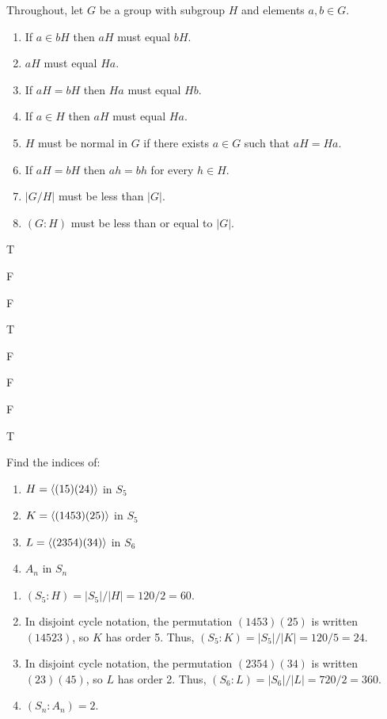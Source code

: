 \begin{exercise}
\tf Throughout, let $G$ be a group with subgroup $H$ and elements $a,b\in G$.

\begin{enumerate}
\item If $a\in bH$ then $aH$ must equal $bH$.
\item $aH$ must equal $Ha$.
\item If $aH=bH$ then $Ha$ must equal $Hb$.
\item If $a\in H$ then $aH$ must equal $Ha$.
\item $H$ must be normal in $G$ if there exists $a\in G$ such that $aH=Ha$.
\item If $aH=bH$ then $ah=bh$ for every $h\in H$.
\item $|G/H|$ must be less than $|G|$.
\item $(G:H)$ must be less than or equal to $|G|$.
\end{enumerate}
\end{exercise}

\begin{solution}[print=false]
\begin{inparaenum}[(a)]
\item T \hfill \item F \hfill \item F \hfill \item T \hfill \item F \hfill \item F \hfill \item F \hfill \item T
\end{inparaenum}
\end{solution}

\begin{exercise}
Find the indices of:

\begin{enumerate}\item $H=\langle(15)(24)\rangle$ in $S_5$
\item $K=\langle(1453)(25)\rangle$ in $S_5$
\item $L=\langle(2354)(34)\rangle$ in $S_6$
\item $A_n$ in $S_n$
\end{enumerate}
\end{exercise}


\begin{solution}[print=false]
 \begin{enumerate}\item $(S_5:H)=|S_5|/|H|=120/2=60.$
\item In disjoint cycle notation, the permutation $(1453)(25)$ is written $(14523)$, so $K$ has order 5. Thus, $(S_5:K)=|S_5|/|K|=120/5=24.$
\item In disjoint cycle notation, the permutation $(2354)(34)$ is written $(23)(45)$, so $L$ has order 2. Thus, $(S_6:L)=|S_6|/|L|=720/2=360.$
\item $(S_n:A_n)=2$.
\end{enumerate}
\end{solution}


